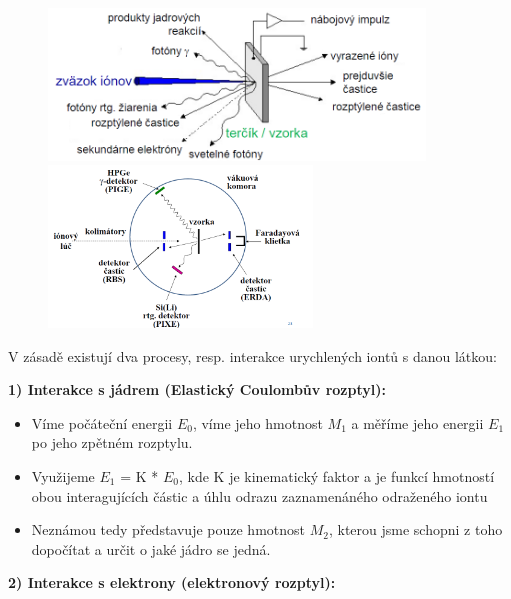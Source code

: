 \begin{figure}[H]
    \centering
	\includegraphics[width=10cm]{img/iont-svazky.png}
	\includegraphics[width=7cm]{img/iont-svazky-exp.png}
\end{figure}

V zásadě existují dva procesy, resp. interakce urychlených iontů s danou látkou:

\textbf{1) Interakce s jádrem (Elastický Coulombův rozptyl):}

\begin{itemize}
    \item Víme počáteční energii $E_0$, víme jeho hmotnost $M_1$ a měříme jeho energii $E_1$ po jeho zpětném rozptylu.
    \item Využijeme $E_1$ = K * $E_0$, kde K je kinematický faktor a je funkcí hmotností obou interagujících částic a úhlu odrazu zaznamenáného odraženého iontu
    \item Neznámou tedy představuje pouze hmotnost $M_2$, kterou jsme schopni z toho dopočítat a určit o jaké jádro se jedná.
\end{itemize}

\textbf{2) Interakce s elektrony (elektronový rozptyl):}

